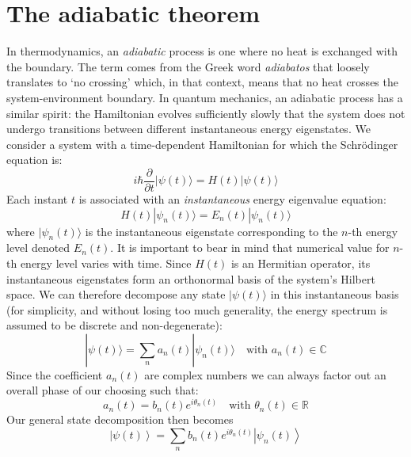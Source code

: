 \documentclass[11pt,a4paper]{article}
\begin{document}
\section{The adiabatic theorem}\label{sec:The adiabatic theorem}
In thermodynamics, an \emph{adiabatic} process is one where no heat is exchanged with the boundary. The term comes from the Greek word \emph{adiabatos} that loosely translates to ‘no crossing’ which, in that context, means that no heat crosses the system-environment boundary. In quantum mechanics, an adiabatic process has a similar spirit: the Hamiltonian evolves sufficiently slowly that the system does not undergo transitions between different instantaneous energy eigenstates. We consider a system with a time-dependent Hamiltonian for which the Schrödinger equation is:
\begin{equation}
\label{eq:TDSE}
i\hbar \frac{\partial}{\partial t} |\psi(t)\rangle = H(t)|\psi(t)\rangle
\end{equation}
Each instant $t$ is associated with an \emph{instantaneous} energy eigenvalue equation:
\begin{equation}
\label{eq:Electronic eigenvalue equation}
H(t)|\psi_n(t)\rangle = E_n(t)|\psi_n(t)\rangle
\end{equation}
where $|\psi_n(t)\rangle$ is the instantaneous eigenstate corresponding to the $n$-th energy level denoted $E_n(t)$. It is important to bear in mind that numerical value for $n$-th energy level varies with time. Since $H(t)$ is an Hermitian operator, its instantaneous eigenstates form an orthonormal basis of the system’s Hilbert space. We can therefore decompose any state $|\psi(t)\rangle$ in this instantaneous basis (for simplicity, and without losing too much generality, the energy spectrum is assumed to be discrete and non-degenerate):
\begin{equation*}
	|\psi(t)\rangle = \sum_n a_n(t) |\psi_n(t)\rangle \quad \text{with } a_n(t) \in \mathbb{C}
\end{equation*}
Since the coefficient $a_n(t)$ are complex numbers we can always factor out an overall phase of our choosing such that:
\begin{equation*}
	a_n(t) = b_n(t) e^{i\theta_n(t)} \quad \text{with } \theta_n(t) \in \mathbb{R}
\end{equation*}
Our general state decomposition then becomes
\begin{equation*}
	\left|\psi(t)\right\rangle = \sum_n b_n(t) e^{i\theta_n(t)} \left|\psi_n(t)\right\rangle
\end{equation*}
\end{document}
